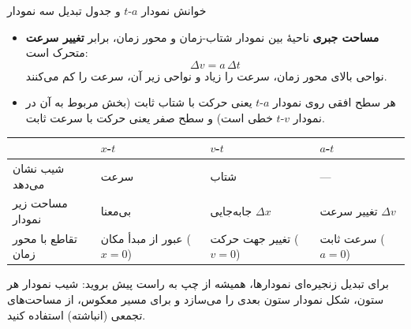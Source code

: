 \documentclass[12pt, a4paper]{article}
\begin{document}
\begin{conceptbox}{خوانش نمودار $a$-$t$ و جدول تبدیل سه نمودار}
\begin{itemize}
    \item \textbf{مساحت جبری} ناحیهٔ بین نمودار شتاب-زمان و محور زمان، برابر \textbf{تغییر سرعت} متحرک است:
    \[
    \Delta v = a\,\Delta t
    \]
    نواحی بالای محور زمان، سرعت را زیاد و نواحی زیر آن، سرعت را کم می‌کنند.
    \item هر سطح افقی روی نمودار $a$-$t$ یعنی حرکت با شتاب ثابت (بخش مربوط به آن در نمودار $v$-$t$ خطی است) و سطح صفر یعنی حرکت با سرعت ثابت.
\end{itemize}
\begin{center}
\begin{tabular}{p{1.8cm} p{3.3cm} p{3.3cm} p{3.3cm}}
\toprule
 & $x$-$t$ & $v$-$t$ & $a$-$t$ \\
\midrule
شیب نشان می‌دهد & سرعت & شتاب & --- \\
مساحت زیر نمودار & بی‌معنا & جابه‌جایی $\Delta x$ & تغییر سرعت $\Delta v$ \\
تقاطع با محور زمان & عبور از مبدأ مکان ($x=0$) & تغییر جهت حرکت ($v=0$) & سرعت ثابت ($a=0$) \\
\bottomrule
\end{tabular}
\end{center}
برای تبدیل زنجیره‌ای نمودارها، همیشه از چپ به راست پیش بروید: شیب نمودار هر ستون، شکل نمودار ستون بعدی را می‌سازد و برای مسیر معکوس، از مساحت‌های تجمعی (انباشته) استفاده کنید.
\end{conceptbox}
\end{document}
